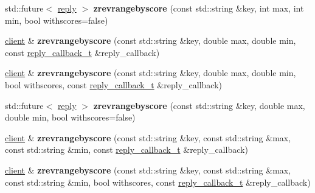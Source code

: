 \begin{DoxyCompactItemize}
\item 
\mbox{\label{classcpp__redis_1_1client_a9f627d5567f55d5b9db5b46412890e54}} 
std\+::future$<$ \hyperlink{classcpp__redis_1_1reply}{reply} $>$ {\bfseries zrevrangebyscore} (const std\+::string \&key, int max, int min, bool withscores=false)
\item 
\mbox{\label{classcpp__redis_1_1client_a8f6819684fc0d53cbc2f1a1f311bb15c}} 
\hyperlink{classcpp__redis_1_1client}{client} \& {\bfseries zrevrangebyscore} (const std\+::string \&key, double max, double min, const \hyperlink{classcpp__redis_1_1client_a061a1140d36d2eaeda82b09a0bb3f9f2}{reply\+\_\+callback\+\_\+t} \&reply\+\_\+callback)
\item 
\mbox{\label{classcpp__redis_1_1client_ab444013b2a1abd58dcfa8af9ebf89b4d}} 
\hyperlink{classcpp__redis_1_1client}{client} \& {\bfseries zrevrangebyscore} (const std\+::string \&key, double max, double min, bool withscores, const \hyperlink{classcpp__redis_1_1client_a061a1140d36d2eaeda82b09a0bb3f9f2}{reply\+\_\+callback\+\_\+t} \&reply\+\_\+callback)
\item 
\mbox{\label{classcpp__redis_1_1client_a0bb954b5c0ecb32137fad2dd4f4ac8f8}} 
std\+::future$<$ \hyperlink{classcpp__redis_1_1reply}{reply} $>$ {\bfseries zrevrangebyscore} (const std\+::string \&key, double max, double min, bool withscores=false)
\item 
\mbox{\label{classcpp__redis_1_1client_a26b125caa689ec8fa1e66db4afe19e1a}} 
\hyperlink{classcpp__redis_1_1client}{client} \& {\bfseries zrevrangebyscore} (const std\+::string \&key, const std\+::string \&max, const std\+::string \&min, const \hyperlink{classcpp__redis_1_1client_a061a1140d36d2eaeda82b09a0bb3f9f2}{reply\+\_\+callback\+\_\+t} \&reply\+\_\+callback)
\item 
\mbox{\label{classcpp__redis_1_1client_a6ba71594666d7af651e3ebb8794c8af7}} 
\hyperlink{classcpp__redis_1_1client}{client} \& {\bfseries zrevrangebyscore} (const std\+::string \&key, const std\+::string \&max, const std\+::string \&min, bool withscores, const \hyperlink{classcpp__redis_1_1client_a061a1140d36d2eaeda82b09a0bb3f9f2}{reply\+\_\+callback\+\_\+t} \&reply\+\_\+callback)

\end{DoxyCompactItemize}
